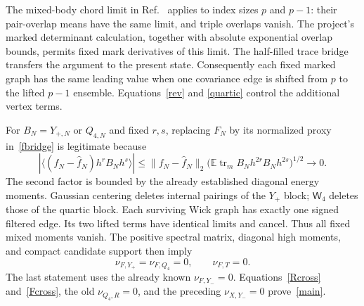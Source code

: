 \documentclass[11pt,a4paper]{article}
\newcommand{\EE}{\mathbb E}
\newcommand{\tr}{\operatorname{tr}}
\newcommand{\W}[1]{\mathsf W_{#1}}
\begin{document}
The mixed-body chord limit in Ref.~\cite{BNR} applies to index
sizes $p$ and $p-1$: their pair-overlap means have the same
limit, and triple overlaps vanish. The project's marked
determinant calculation, together with absolute exponential
overlap bounds, permits fixed mark derivatives of this limit.
The half-filled trace bridge transfers the argument to the
present state. Consequently each fixed marked graph has the
same leading value when one covariance edge is shifted from
$p$ to the lifted $p-1$ ensemble. Equations~\eqref{rev} and
\eqref{quartic} control the additional vertex terms.

For $B_N=Y_{+,N}$ or $Q_{4,N}$ and fixed $r,s$, replacing $F_N$
by its normalized proxy in~\eqref{fbridge} is legitimate because
\begin{equation}
 |\langle(f_N-\widehat f_N)h^rB_Nh^s\rangle|
 \leq\|f_N-\widehat f_N\|_2
       \big(\EE\tr_m B_Nh^{2r}B_Nh^{2s}\big)^{1/2}\longrightarrow0.
\end{equation}
The second factor is bounded by the already established diagonal
energy moments. Gaussian centering deletes internal pairings of
the $Y_+$ block; $\W4$ deletes those of the quartic block.
Each surviving Wick graph has exactly one signed filtered edge.
Its two lifted terms have identical limits and cancel. Thus all
fixed mixed moments vanish. The positive spectral matrix,
diagonal high moments, and compact candidate support then imply
\begin{equation}
 \boxed{\ \nu_{F,Y_+}=\nu_{F,Q_4}=0,\qquad \nu_{F,T}=0.\ } \label{Fcross}
\end{equation}
The last statement uses the already known $\nu_{F,Y_-}=0$.
Equations~\eqref{Rcross} and~\eqref{Fcross}, the old
$\nu_{Q_4,R}=0$, and the preceding $\nu_{X,Y_-}=0$ prove~\eqref{main}.

\newpage
\end{document}
